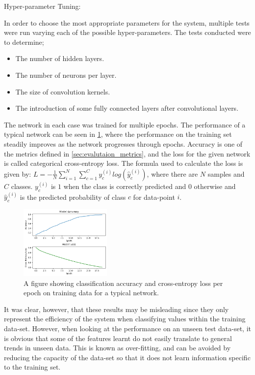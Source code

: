 Hyper-parameter Tuning:

In order to choose the most appropriate parameters for the system, multiple tests were run varying each of the possible hyper-parameters. The tests conducted were to determine;

\begin{itemize}
    \item The number of hidden layers.
    \item The number of neurons per layer.
    \item The size of convolution kernels.
    \item The introduction of some fully connected layers after convolutional layers.
\end{itemize}

The network in each case was trained for multiple epochs. The performance of a typical network can be seen in \cref{fig:accuracy_and_loss_per_epoch}, where the performance on the training set steadily improves as the network progresses through epochs. Accuracy is one of the metrics defined in \cref{sec:evalutaion_metrics}, and the loss for the given network is called categorical cross-entropy loss. The formula used to calculate the loss is given by: $ L = -\frac{1}{N}\sum^N_{i=1}\sum^C_{c=1}y_c^{(i)}log(\hat{y}_c^{(i)}) $, where there are $ N $ samples and $ C $ classes. $ y_c^{(i)} $ is $ 1 $ when the class is correctly predicted and $ 0 $ otherwise and $ \hat{y}_c^{(i)} $ is the predicted probability of class $ c $ for data-point $ i $.

\begin{figure}[htb]
    \centering
    \includegraphics[width=0.4\textwidth]{implementation/images/accuracy_and_loss_per_epoch.png}
    \caption{A figure showing classification accuracy and cross-entropy loss per epoch on training data for a typical network.}
    \label{fig:accuracy_and_loss_per_epoch}
\end{figure}

It was clear, however, that these results may be misleading since they only represent the efficiency of the system when classifying values within the training data-set. However, when looking at the performance on an unseen test data-set, it is obvious that some of the features learnt do not easily translate to general trends in unseen data. This is known as over-fitting, and can be avoided by reducing the capacity of the data-set so that it does not learn information specific to the training set.

